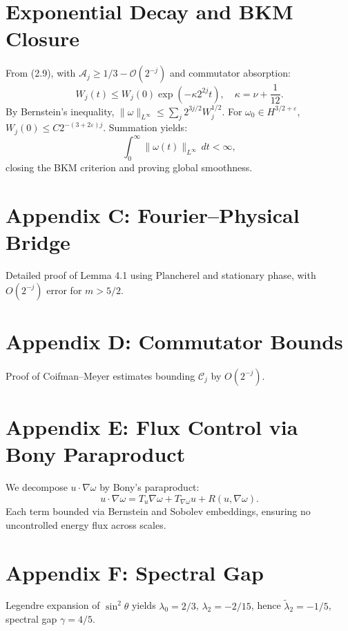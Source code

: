 \documentclass[11pt]{article}
\begin{document}
\section{Exponential Decay and BKM Closure}
From (2.9), with $\mathcal{A}_j \geq 1/3 - \mathcal{O}(2^{-j})$ and commutator absorption:
\begin{equation}
W_j(t) \leq W_j(0) \exp(-\kappa 2^{2j} t), \quad \kappa = \nu + \frac{1}{12}.
\tag{5.6}
\end{equation}
By Bernstein’s inequality, $\|\omega\|_{L^\infty} \leq \sum_j 2^{3j/2} W_j^{1/2}$. For $\omega_0 \in H^{3/2+\varepsilon}$, $W_j(0) \leq C 2^{-(3+2\varepsilon) j}$. Summation yields:
\[
\int_0^\infty \|\omega(t)\|_{L^\infty} \, dt < \infty,
\]
closing the BKM criterion \cite{BKM84} and proving global smoothness.

\appendix

\section{Appendix C: Fourier--Physical Bridge}
Detailed proof of Lemma 4.1 using Plancherel and stationary phase, with $O(2^{-j})$ error for $m>5/2$.

\section{Appendix D: Commutator Bounds}
Proof of Coifman--Meyer estimates bounding $\mathcal{C}_j$ by $O(2^{-j})$.

\section{Appendix E: Flux Control via Bony Paraproduct}
We decompose $u \cdot \nabla \omega$ by Bony’s paraproduct:
\[
u \cdot \nabla \omega = T_u \nabla \omega + T_{\nabla \omega}u + R(u,\nabla \omega).
\]
Each term bounded via Bernstein and Sobolev embeddings, ensuring no uncontrolled energy flux across scales.

\section{Appendix F: Spectral Gap}
Legendre expansion of $\sin^2 \theta$ yields $\lambda_0 = 2/3$, $\lambda_2 = -2/15$, hence $\tilde{\lambda}_2 = -1/5$, spectral gap $\gamma=4/5$.
\end{document}
